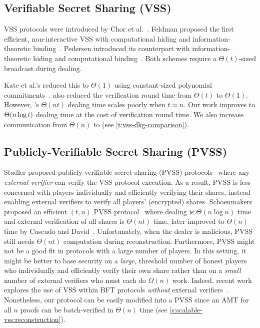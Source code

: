 \subsection{Verifiable Secret Sharing (VSS)}
\label{s:related-work:vss}
VSS protocols were introduced by Chor et al.~\cite{CGMA85}.
Feldman proposed the first efficient, non-interactive VSS with computational hiding and information-theoretic binding~\cite{Feldman87}.
Pedersen introduced its counterpart with information-theoretic hiding and computational binding~\cite{Pedersen1991NonInteractive}.
Both schemes require a $\Theta(t)$-sized broadcast during dealing.

Kate et al.'s \evss reduced this to $\Theta(1)$ using constant-sized polynomial commitments~\cite{KZG10a}.
\evss also reduced the verification round time from $\Theta(t)$ to $\Theta(1)$.
However, \evss's $\Theta(nt)$ dealing time scales poorly when $t\approx n$.
Our work improves \evss to $\Theta(n\log{t})$ dealing time at the cost of \amtOneShareVerifTime verification round time.
We also increase communication from $\Theta(n)$ to \amtAllShareVerifTime (see \cref{t:vss-dkg-comparison}).

\subsection{Publicly-Verifiable Secret Sharing (PVSS)}
\label{s:related-work:pvss}

Stadler proposed publicly verifiable secret sharing (PVSS) protocols~\cite{Stadler1996Publicly} where any \textit{external verifier} can verify the VSS protocol execution.
As a result, PVSS is less concerned with players individually and efficiently verifying their shares, instead enabling external verifiers to verify all players' (encrypted) shares.
Schoenmakers proposed an efficient $(t,n)$ PVSS protocol~\cite{Schoenmakers1999} where dealing is $\Theta(n\log{n})$ time and external verification of all shares is $\Theta(nt)$ time, later improved to $\Theta(n)$ time by Cascudo and David~\cite{CD17a}.
Unfortunately, when the dealer is malicious, PVSS still needs $\Theta(nt)$ computation during reconstruction.
Furthermore, PVSS might not be a good fit in protocols with a large number of players.
In this setting, it might be better to base security on a \textit{large}, threshold number of honest players who individually and efficiently verify their own share rather than on a \textit{small} number of external verifiers who must each do $\Omega(n)$ work.
Indeed, recent work explores the use of VSS within BFT protocols \textit{without} external verifiers~\cite{BTA+19}.
Nonetheless, our \ourvss protocol can be easily modified into a PVSS since an AMT for all $n$ proofs can be batch-verified in $\Theta(n)$ time (see \cref{s:scalable-vss:reconstruction}).

